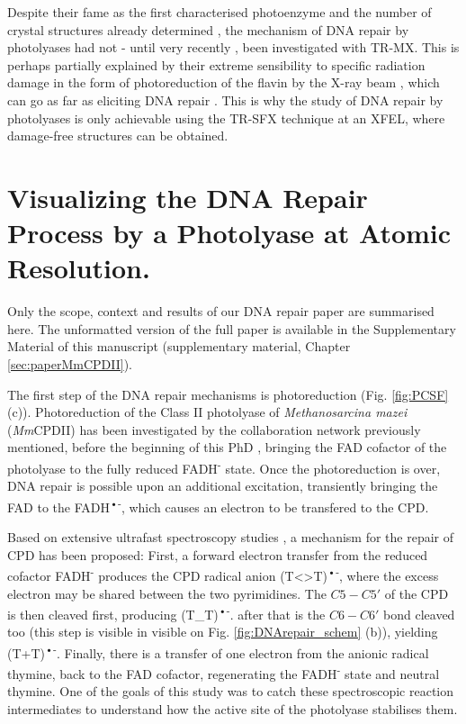 Despite their fame as the first characterised photoenzyme and the number of crystal structures already determined \parencite{mullerStructuralBiologyDNA2009}, the mechanism of DNA repair by photolyases had not - until very recently \parencite{maestre-reynaVisualizingDNARepair2023a, christouTimeresolvedCrystallographyCaptures2023a}, been investigated with TR-MX. This is perhaps partially explained by their extreme sensibility to specific radiation damage in the form of photoreduction of the flavin by the X-ray beam \parencite{kortDNAApophotolyaseAnacystis2004}, which can go as far as eliciting DNA repair \parencite{meesCrystalStructurePhotolyase2004}.  This is why the study of DNA repair by photolyases is only achievable using the TR-SFX technique at an XFEL, where damage-free structures can be obtained. 

\section{Visualizing the DNA Repair Process by a Photolyase at Atomic Resolution.}\label{sec:prior_MmCPDII}
Only the scope, context and results of our DNA repair paper are summarised here. The unformatted version of the full paper is available in the Supplementary Material of this manuscript (supplementary material, Chapter \ref{sec:paperMmCPDII}).

The first step of the DNA repair mechanisms is photoreduction (Fig. \ref{fig:PCSF} (c)). Photoreduction of the Class II photolyase of \textit{Methanosarcina mazei} (\textit{Mm}CPDII) has been investigated by the collaboration network previously mentioned, before the beginning of this PhD \parencite{maestre-reynaSerialCrystallographyCaptures2022}, bringing the FAD cofactor of the photolyase to the fully reduced  FADH\textsuperscript{-} state. Once the photoreduction is over, DNA repair is possible upon an additional excitation, transiently bringing the FAD to the FADH\textsuperscript{•-}, which causes an electron to be transfered to the CPD. 

Based on extensive ultrafast spectroscopy studies \parencite{zhangPhotolyaseDynamicsElectrontransfer2017}, a mechanism for the repair of CPD has been proposed: First, a forward electron transfer from the reduced cofactor FADH\textsuperscript{-} produces the CPD radical anion (T<>T)\textsuperscript{•-}, where the excess electron may be shared between the two pyrimidines. The \(C5-C5'\) of the CPD is then cleaved first, producing (T\_T)\textsuperscript{•-}. after that is the \(C6-C6'\) bond cleaved too (this step is visible in visible on Fig. \ref{fig:DNArepair_schem} (b)), yielding (T+T)\textsuperscript{•-}. Finally, there is a transfer of one electron from the anionic radical thymine, back to the FAD cofactor, regenerating the FADH\textsuperscript{-} state and neutral thymine. One of the goals of this study was to catch these spectroscopic reaction intermediates to understand how the active site of the photolyase stabilises them. 

